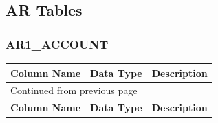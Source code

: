 \documentclass[12pt,twoside]{article}
\begin{document}
\subsection{AR Tables}
\label{sec:orgheadline98}
\subsubsection{AR1\_ACCOUNT}
\label{sec:orgheadline86}
\footnotesize
\begin{longtable}{l|l|l}
\hline
\textbf{Column Name} & \textbf{Data Type} & \textbf{Description}\\
\hline
\endfirsthead
\multicolumn{3}{l}{Continued from previous page} \\
\hline

\textbf{Column Name} & \textbf{Data Type} & \textbf{Description} \\


\end{longtable}
\end{document}
